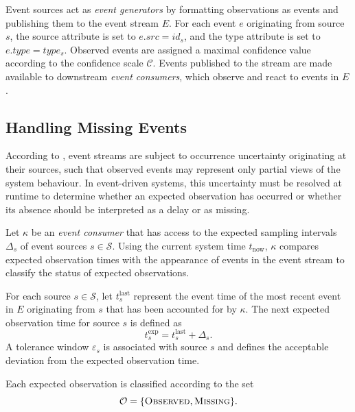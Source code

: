 Event sources act as \emph{event generators} by formatting observations as events and publishing them to the event stream $E$. For each event $e$ originating from source $s$, the source attribute is set to $e.src = id_s$, and the type attribute is set to $e.type = type_s$. Observed events are assigned a maximal confidence value according to the confidence scale $\mathcal{C}$.
Events published to the stream are made available to downstream \emph{event consumers}, which observe and react to events in $E$.


\subsection{Handling Missing Events}
\label{sec:scheduling-missing}

According to \citet{wasserkrug2006taxonomy}, event streams are subject to occurrence uncertainty originating at their sources, such that observed events may represent only partial views of the system behaviour. In event-driven systems, this uncertainty must be resolved at runtime to determine whether an expected observation has occurred or whether its absence should be interpreted as a delay or as missing.

Let $\kappa$ be an \emph{event consumer} that has access to the expected sampling intervals $\Delta_s$ of event sources $s \in \mathcal{S}$. Using the current system time $t_{\mathrm{now}}$, $\kappa$ compares expected observation times with the appearance of events in the event stream to classify the status of expected observations.

For each source $s \in \mathcal{S}$, let $t^{\mathrm{last}}_s$ represent the event time of the most recent event in $E$ originating from $s$ that has been accounted for by $\kappa$. The next expected observation time for source $s$ is defined as
\begin{equation}
t^{\mathrm{exp}}_s = t^{\mathrm{last}}_s + \Delta_s .
\end{equation}
A tolerance window $\varepsilon_s$ is associated with source $s$ and defines the acceptable deviation from the expected observation time.

Each expected observation is classified according to the set
\begin{equation}
\mathcal{O} = \{\textsc{Observed}, \textsc{Missing}\}.
\end{equation}

